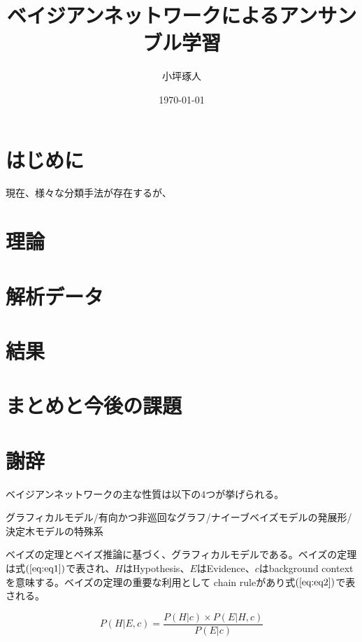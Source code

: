 \documentclass[a4j,12pt]{jarticle}
\title{ベイジアンネットワークによるアンサンブル学習}   %
\author{小坪琢人}   %
\date{\today}   %
\begin{document}
\maketitle   %
\setlength{\baselineskip}{20pt}   %
\tableofcontents   %
\listoffigures   %
\listoftables   %
\clearpage   %


\section{はじめに}

現在、様々な分類手法が存在するが、

\section{理論}

\section{解析データ}

\section{結果}

\section{まとめと今後の課題}

\section{謝辞}

ベイジアンネットワークの主な性質は以下の4つが挙げられる。

グラフィカルモデル/有向かつ非巡回なグラフ/ナイーブベイズモデルの発展形/決定木モデルの特殊系

ベイズの定理とベイズ推論に基づく、グラフィカルモデルである。ベイズの定理は式$(\ref{eq:eq1})$で表され、$H$はHypothesis、$E$はEvidence、$c$はbackground contextを意味する。ベイズの定理の重要な利用として chain ruleがあり式$(\ref{eq:eq2})$で表される。

\begin{equation}
\label{eq:eq1}
P(H|E,c) = \frac{P(H|c) \times P(E|H,c)}{P(E|c)}
\end{equation}
\end{document}
